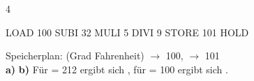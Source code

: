 \documentclass[11pt,a4paper]{article}
\begin{document}
\begin{aufgabe}{4}
\begin{minipage}[t]{0.3\linewidth}
\vspace{0pt}
\begin{asm}[aboveskip=0mm]
LOAD 100
SUBI 32
MULI 5
DIVI 9
STORE 101
HOLD
\end{asm}
\end{minipage}\hfill
\begin{minipage}[t]{0.66\linewidth}
\vspace{0pt}\lueckentext
Speicherplan:  (Grad Fahrenheit) $\to$ 100,  $\to$ 101\\
\textbf{a)} 
\textbf{b)} Für  = 212 ergibt sich , für  = 100 ergibt sich .
\end{minipage}
\end{aufgabe}
\end{document}
